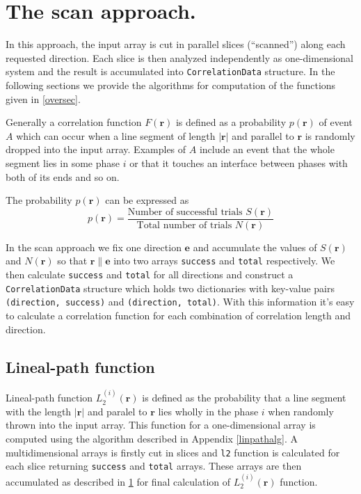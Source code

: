 \documentclass[reprint,amsmath,amssymb,aps,pre,showkeys,showpacs,nofootinbib]{revtex4-1}
\newcommand{\code}[1]{\colorbox{light-gray}{\texttt{#1}}}
\newcommand{\apref}[1]{Appendix \ref{#1}}
\begin{document}
\section{The scan approach.}
\label{scansec}
In this approach, the input array is cut in parallel slices (``scanned'') along
each requested direction. Each slice is then analyzed independently as
one-dimensional system and the result is accumulated into \code{CorrelationData}
structure. In the following sections we provide the algorithms for computation
of the functions given in \cref{oversec}.

Generally a correlation function $F(\bm{r})$ is defined as a probability
$p(\bm{r})$ of event $A$ which can occur when a line segment of length
$|\bm{r}|$ and parallel to $\bm{r}$ is randomly dropped into the input
array. Examples of $A$ include an event that the whole segment lies in some
phase $i$ or that it touches an interface between phases with both of its ends
and so on.

The probability $p(\bm{r})$ can be expressed as
\begin{equation}\label{eq:probability}
  p(\bm{r}) = \frac{\text{Number of successful trials $S(\bm{r})$}}
  {\text{Total number of trials $N(\bm{r})$}}
\end{equation}

In the scan approach we fix one direction $\bm{e}$ and accumulate the values of
$S(\bm{r})$ and $N(\bm{r})$ so that $\bm{r} \parallel \bm{e}$ into two arrays
\code{success} and \code{total} respectively. We then calculate \code{success}
and \code{total} for all directions and construct a \code{CorrelationData}
structure which holds two dictionaries with key-value pairs
\code{(direction, success)} and \code{(direction, total)}. With this information
it's easy to calculate a correlation function for each combination of
correlation length and direction.

\subsection{Lineal-path function}
Lineal-path function $L_2^{(i)}(\bm{r})$ is defined as the probability that a
line segment with the length $|\bm{r}|$ and paralel to $\bm{r}$ lies wholly in
the phase $i$ when randomly thrown into the input array. This function for a
one-dimensional array is computed using the algorithm described in
\apref{linpathalg}. A multidimensional arrays is firstly cut in slices and
\code{l2} function is calculated for each slice returning \code{success} and
\code{total} arrays. These arrays are then accumulated as described in
\cref{scansec} for final calculation of $L_2^{(i)}(\bm{r})$ function.
\end{document}
